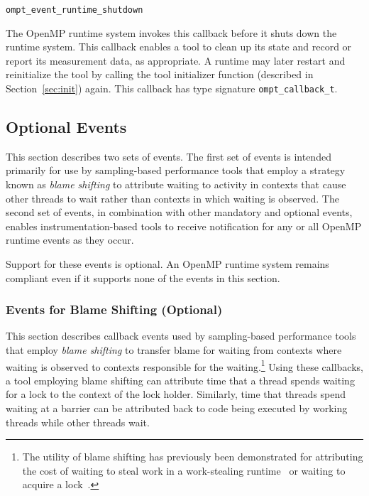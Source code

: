 \documentclass{article}
\newcommand{\descheader}[1]{{\needspace{3\baselineskip}\vspace{1em}\noindent \fbox{#1}}}
\begin{document}
\descheader{Termination}

\begin{description}

\item \verb|ompt_event_runtime_shutdown|
 
The OpenMP runtime system invokes this callback before it shuts down the
 runtime system.  This callback enables a tool to clean up its
 state and record or report its measurement data, as appropriate. A runtime may later restart and reinitialize the tool by
calling the tool initializer
function (described in Section~\ref{sec:init}) again.
 This callback has type signature \verb|ompt_callback_t|. 


\end{description}

\subsection{Optional Events}
This section describes two sets of events. 
The first set of events is intended primarily for use by sampling-based performance tools that 
employ a strategy known as {\em blame shifting} to attribute waiting to activity in
 contexts that cause other threads to wait
rather than contexts in which waiting is observed.
The second set of events, in combination with other mandatory and optional events, 
enables instrumentation-based tools to receive notification for any or all OpenMP runtime events as they occur.
 
Support for these events is optional. An OpenMP runtime system remains compliant even if it supports none of the events in this section.


\subsubsection{Events for Blame Shifting (Optional)}
\label{sec:blame}
This section describes callback events used by sampling-based performance tools 
that employ {\em blame shifting} to transfer blame for waiting from contexts 
where waiting is observed to contexts responsible for the waiting.\footnote{The utility of blame shifting has previously been demonstrated for attributing the cost of waiting to steal work 
in a work-stealing runtime~\cite{Tallent:PPoPP09} or waiting to acquire a lock~\cite{Tallent:PPoPP10}.}
Using these callbacks, a tool employing blame shifting 
can attribute time that a thread spends waiting for a lock to the context of the lock holder.
Similarly, time that threads spend waiting at a barrier can be attributed back 
to code being executed by working threads while other threads wait.
\end{document}
